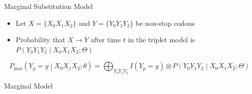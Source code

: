 \documentclass[aspectratio=169,font=14pt]{beamer}
\newcommand{\grande}[1]{\mathlarger{\mathlarger{#1}}}
\begin{document}
\begin{frame}{Marginal Substitution Model} %
\begin{itemize}
    \item Let $X= \{X_0 X_1 X_2\}$ and $Y = \{Y_0 Y_1 Y_2\}$ be non-stop codons
    \item Probability that $X \rightarrow Y$ after time $t$ in the triplet model is $P\left(Y_0 Y_1 Y_2 \middle| X_0 X_1 X_2; \Theta \right)$
\end{itemize}

\begin{equation*}
P_\text{mar}\left(Y_p = y \middle| X_0 X_1 X_2;\theta \right) =
\bigoplus_{Y_0 Y_1 Y_2} I(Y_p = y) \otimes P\left(Y_0 Y_1 Y_2 \middle| X_0 X_1 X_2;\Theta \right)
\end{equation*}


\end{frame} %

\begin{frame}{Marginal Model} %
\centering
\resizebox{!}{0.9\textheight}{}
\end{frame} %
\end{document}
